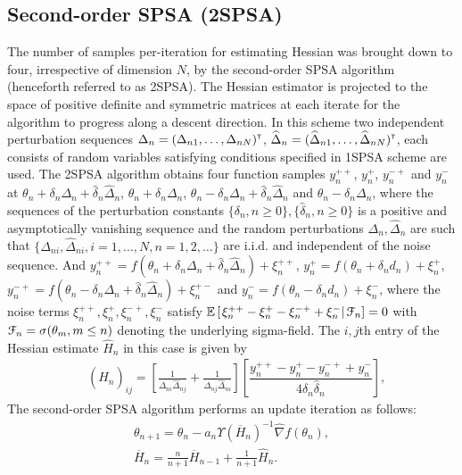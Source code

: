 \subsection{Second-order SPSA (2SPSA)}
The number of samples per-iteration for estimating Hessian was brought down to four, irrespective of dimension $N$, by the second-order SPSA algorithm (henceforth referred to as 2SPSA). The Hessian estimator is projected to the space of positive definite and symmetric matrices at each iterate for the algorithm to progress along a descent direction. In this scheme two independent perturbation sequences $\Delta_n = (\Delta_{n1},\ldots,\Delta_{nN})^\mathsf{\scriptscriptstyle T}$, $\widehat \Delta_n = (\widehat \Delta_{n1},\ldots,\widehat \Delta_{nN})^\mathsf{\scriptscriptstyle T}$, each consists of random variables satisfying conditions specified in 1SPSA scheme are used.
The 2SPSA algorithm obtains four function samples $y_n^{++}$, $y_n^+$,  $y_n^{-+}$ and $y_n^{-}$ at $\theta_n + \delta_n \Delta_n + \widehat \delta_n \widehat \Delta_n $, $\theta_n +\delta_n \Delta_n$, $\theta_n - \delta_n \Delta_n + \widehat \delta_n \widehat \Delta_n$ and $\theta_n - \delta_n \Delta_n$, where  the sequences of the perturbation constants $\{\delta_n, n\ge 0\}, \{\widehat \delta_n, n\ge 0\}$ is a positive and asymptotically vanishing sequence and
the random perturbations $\Delta_n, \widehat \Delta_n$ are such that $\{\Delta_{ni},\widehat\Delta_{ni}, i=1,\ldots,N, n=1,2,\ldots\}$ are i.i.d. and independent of the noise sequence. And $y_n^{++} = f(\theta_n + \delta_n \Delta_n + \widehat \delta_n \widehat \Delta_n ) + \xi_n^{++}$, $y_n^+ = f(\theta_n+\delta_n d_n) + \xi_n^+$, $y_n^{-+} = f(\theta_n - \delta_n \Delta_n + \widehat \delta_n \widehat \Delta_n) + \xi_n^{+-}$ and $y_n^- = f(\theta_n-\delta_n d_n) + \xi_n^-$, where the noise terms $\xi_n^{++}, \xi_n^+, \xi_n^{-+}, \xi_n^-$ satisfy $\mathbb{E}\left[\left.\xi_n^{++} - \xi_n^+ - \xi_n^{-+} +  \xi_n^-\right| \mathcal{F}_n\right] = 0$ with $\mathcal{F}_n = \sigma(\theta_m,m\le n)$ denoting the underlying sigma-field. The $i,j$th entry of the Hessian estimate $\widehat H_n$ in this case is given by
\begin{align}
\label{eq:2spsahhat}
&\left(\widehat H_n\right)_{ij} = \left[\frac{1}{\Delta_{ni}\widehat \Delta_{nj}} + \frac{1}{\Delta_{nj}\widehat \Delta_{ni}} \right] \left[\dfrac{y_n^{++} - y_n^+ - y_n^{-+} + y_n^-}{4 \delta_n \widehat \delta_n}\right], 
\end{align}
The second-order SPSA algorithm performs an update iteration as follows:
\begin{align}
\label{eq:2spsa}
\theta_{n+1} = \theta_n - a_n \Upsilon(\overline H_n)^{-1}\widehat\nabla f(\theta_n), \\
\overline H_n = \frac{n}{n+1} \overline H_{n-1} + \frac{1}{n+1} \widehat H_n.\label{eq:2spsa-H}
\end{align}
